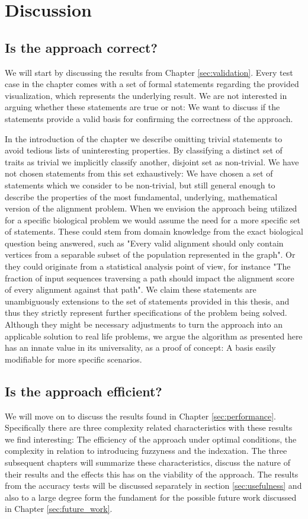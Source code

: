 \documentclass[thesis.tex]{subfiles}
\begin{document}
\chapter{Discussion}
\label{sec:discussion}
\section{Is the approach correct?}
We will start by discussing the results from Chapter \ref{sec:validation}. Every test case in the chapter comes with a set of formal statements regarding the provided visualization, which represents the underlying result. We are not interested in arguing whether these statements are true or not: We want to discuss if the statements provide a valid basis for confirming the correctness of the approach. \\
\par\noindent
In the introduction of the chapter we describe omitting trivial statements to avoid tedious lists of uninteresting properties. By classifying a distinct set of traits as trivial we implicitly classify another, disjoint set as non-trivial. We have not chosen statements from this set exhaustively: We have chosen a set of statements which we consider to be non-trivial, but still general enough to describe the properties of the most fundamental, underlying, mathematical version of the alignment problem. When we envision the approach being utilized for a specific biological problem we would assume the need for a more specific set of statements. These could stem from domain knowledge from the exact biological question being answered, such as "Every valid alignment should only contain vertices from a separable subset of the population represented in the graph". Or they could originate from a statistical analysis point of view, for instance "The fraction of input sequences traversing a path should impact the alignment score of every alignment against that path". We claim these statements are unambiguously extensions to the set of statements provided in this thesis, and thus they strictly represent further specifications of the problem being solved. Although they might be necessary adjustments to turn the approach into an applicable solution to real life problems, we argue the algorithm as presented here has an innate value in its universality, as a proof of concept: A basis easily modifiable for more specific scenarios.
\section{Is the approach efficient?}
We will move on to discuss the results found in Chapter \ref{sec:performance}. Specifically there are three complexity related characteristics with these results we find interesting: The efficiency of the approach under optimal conditions, the complexity in relation to introducing fuzzyness and the indexation. The three subsequent chapters will summarize these characteristics, discuss the nature of their results and the effects this has on the viability of the approach. The results from the accuracy tests will be discussed separately in section \ref{sec:usefulness} and also to a large degree form the fundament for the possible future work discussed in Chapter \ref{sec:future_work}.
\end{document}
